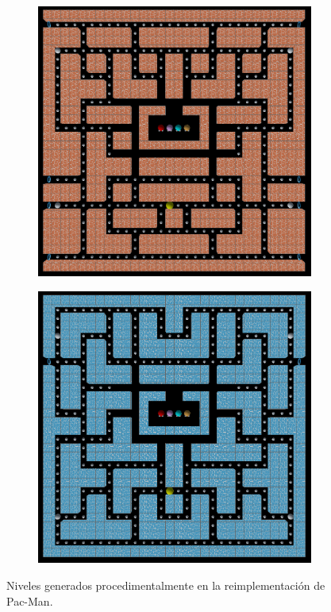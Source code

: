\begin{figure}[H]
\begin{subfigure}[b]{0.48\textwidth}
        \end{subfigure}
        \vspace{0.2cm}
        \\
        \begin{subfigure}[b]{0.48\textwidth}
            \includegraphics[scale=0.18]{img/laberinto5.png}
        \end{subfigure}
        \hfill
        \begin{subfigure}[b]{0.48\textwidth}
            \includegraphics[scale=0.18]{img/laberinto6.png}
        \end{subfigure}
        \caption{Niveles generados procedimentalmente en la reimplementación de Pac-Man.}
        \label{fig:ejemplos}
    \end{figure}

